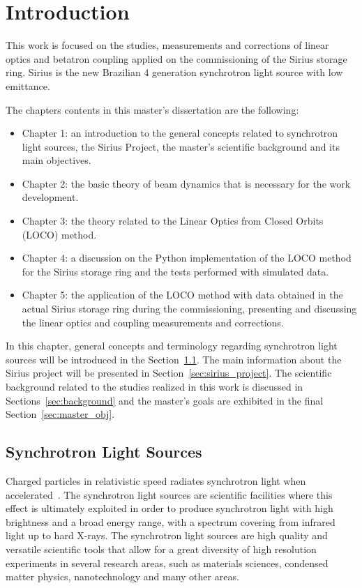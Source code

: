 \chapter{Introduction} \label{chap:intro}
This work is focused on the studies, measurements and corrections of linear optics and betatron coupling applied on the commissioning of the Sirius storage ring. Sirius is the new Brazilian 4 generation synchrotron light source with low emittance. 

The chapters contents in this master's dissertation are the following:
\begin{itemize}
    \item Chapter 1: an introduction to the general concepts related to synchrotron light sources, the Sirius Project, the master's scientific background and its main objectives.
    \item Chapter 2: the basic theory of beam dynamics that is necessary for the work development.
    \item Chapter 3: the theory related to the Linear Optics from Closed Orbits (LOCO) method.
    \item Chapter 4: a discussion on the Python implementation of the LOCO method for the Sirius storage ring and the tests performed with simulated data.
    \item Chapter 5: the application of the LOCO method with data obtained in the actual Sirius storage ring during the commissioning, presenting and discussing the linear optics and coupling measurements and corrections.
\end{itemize}

In this chapter, general concepts and terminology regarding synchrotron light sources will be introduced in the Section~\ref{sec:sls}. The main information about the Sirius project will be presented in Section~\ref{sec:sirius_project}. The scientific background related to the studies realized in this work is discussed in Sections~\ref{sec:background} and the master's goals are exhibited in the final Section~\ref{sec:master_obj}.
\section{Synchrotron Light Sources}\label{sec:sls}
Charged particles in relativistic speed radiates synchrotron light when accelerated~\cite{jackson}. The synchrotron light sources are scientific facilities where this effect is ultimately exploited in order to produce synchrotron light with high brightness and a broad energy range, with a spectrum covering from infrared light up to hard X-rays. The synchrotron light sources are high quality and versatile scientific tools that allow for a great diversity of high resolution experiments in several research areas, such as materials sciences, condensed matter physics, nanotechnology and many other areas.

